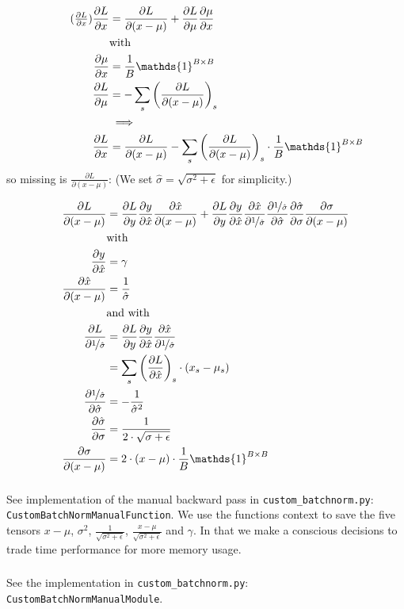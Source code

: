 \documentclass{article}
\newcommand\·{\ensuremath{\cdot}}
\newcommand\…{\ensuremath{\dots}}
\renewcommand\t{\ensuremath{\times}}
\newcommand{\⇔}{\ensuremath{\iff}}
\newcommand{\⇐}{\ensuremath{\impliedby}}
\newcommand{\⇒}{\ensuremath{\implies}}
\newcommand\f[2]{\ensuremath{\frac{#1}{#2}}}
\newcommand\nf[2]{\ensuremath{\nicefrac{#1}{#2}}}
\newcommand\pf[2]{\ensuremath{\frac{\partial {#1}}{\partial {#2}}}}
\newcommand\1{\ensuremath{\mathds{1}}}
\newcommand\ℝ{\ensuremath{\mathds{R}}}
\begin{document}
\begin{align*}
  \tag{\pf{L}{x}}
  \pf{L}{x} &= \pf{L}{(x-\mu)} + \pf{L}{\mu}\pf{\mu}{x}\\
  &\text{with}\\
  \pf{\mu}{x} &= \f{1}{B}\1^{B\t B}\\
  \pf{L}{\mu} &= -\sum_s\left(\pf{L}{(x-\mu)}\right)_s\\
  &\⇒\\
  \pf{L}{x} &= \pf{L}{(x-\mu)} -\sum_s\left(\pf{L}{(x-\mu)}\right)_s\·\f{1}{B}\1^{B\t B}
\end{align*}
so missing is $\pf{L}{(x-\mu)}$: (We set $\hat{\sigma} = \sqrt{\sigma^2 + \epsilon}$ for simplicity.)

\begin{align*}
  \pf{L}{(x-\mu)} &= \pf{L}{y}\pf{y}{\hat{x}}\pf{\hat{x}}{(x-\mu)} + \pf{L}{y}\pf{y}{\hat{x}}\pf{\hat{x}}{\nf{1}{\hat{\sigma}}}\pf{\nf{1}{\hat{\sigma}}}{\hat{\sigma}}\pf{\hat{\sigma}}{\sigma}\pf{\sigma}{(x-\mu)}\\
  &\text{with}\\
  \pf{y}{\hat{x}} &= \gamma\\
  \pf{\hat{x}}{(x-\mu)} &= \f{1}{\hat{\sigma}}\\
  &\text{and with}\\
  \pf{L}{\nf{1}{\hat{\sigma}}}
  &= \pf{L}{y}\pf{y}{\hat{x}}\pf{\hat{x}}{\nf{1}{\hat{\sigma}}}\\
  &= \sum_s \left(\pf{L}{\hat{x}}\right)_s\·(x_s-\mu_s)\\
  \pf{\nf{1}{\hat{\sigma}}}{\hat{\sigma}} &= -\f{1}{\hat{\sigma}^2}\\
  \pf{\hat{\sigma}}{\sigma} &= \f{1}{2\·\sqrt{\sigma+\epsilon}}\\
  \pf{\sigma}{(x-\mu)} &= 2\·(x-\mu)\·\f{1}{B}\1^{B\t B}\\
\end{align*}

\subsubsection{}
See implementation of the manual backward pass in \texttt{custom\_batchnorm.py}: \texttt{CustomBatchNormManualFunction}.
We use the functions context to save the five tensors $x-\mu$, $\sigma^2$, $\f{1}{\sqrt{\sigma^2 +\epsilon}}$, $\f{x-\mu}{\sqrt{\sigma^2 +\epsilon}}$ and $\gamma$.
In that we make a conscious decisions to trade time performance for more memory usage.

\subsubsection{}
See the implementation in \texttt{custom\_batchnorm.py}: \texttt{CustomBatchNormManualModule}.
\end{document}
